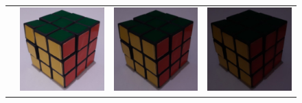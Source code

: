 \begin{figure}
    \setlength{\rubiklength}{3cm}
    \setlength{\raiselength}{1.4cm}
    \centering
    \begin{tabular}{rccc}
         \raisebox{\raiselength}{Original} &
         \includegraphics[width=\rubiklength]{img/rubik/1_orig.jpg} & 
         \includegraphics[width=\rubiklength]{img/rubik/2_orig.jpg} & \includegraphics[width=\rubiklength]{img/rubik/3_orig.jpg}\\
         

\end{tabular}
\end{figure}
